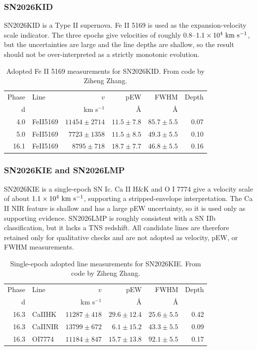 \documentclass[11pt]{article}
\begin{document}
\subsubsection{SN2026KID}
SN2026KID is a Type II supernova. Fe II 5169 is used as the expansion-velocity scale indicator. The three epochs give velocities of roughly $0.8$--$1.1\times10^4~{\rm km~s^{-1}}$, but the uncertainties are large and the line depths are shallow, so the result should not be over-interpreted as a strictly monotonic evolution.

\begin{table}[htbp]
\centering
\caption{Adopted Fe II 5169 measurements for SN2026KID. From code by Ziheng Zhang.}
\label{tab:kid-lines}
\begin{tabular}{r l r r r r}
\toprule
Phase & Line & $v$ & pEW & FWHM & Depth \\
d & & km s$^{-1}$ & \AA & \AA & \\
\midrule
4.0 & FeII5169 & $11454\pm2714$ & $11.5\pm7.8$ & $85.7\pm5.5$ & 0.07 \\
5.0 & FeII5169 & $7723\pm1358$ & $11.5\pm8.5$ & $49.3\pm5.5$ & 0.10 \\
16.1 & FeII5169 & $8795\pm718$ & $18.7\pm7.7$ & $46.8\pm5.5$ & 0.16 \\
\bottomrule
\end{tabular}
\end{table}

\subsubsection{SN2026KIE and SN2026LMP}
SN2026KIE is a single-epoch SN Ic. Ca II H\&K and O I 7774 give a velocity scale of about $1.1\times10^4~{\rm km~s^{-1}}$, supporting a stripped-envelope interpretation. The Ca II NIR feature is shallow and has a large pEW uncertainty, so it is used only as supporting evidence. SN2026LMP is roughly consistent with a SN IIb classification, but it lacks a TNS redshift. All candidate lines are therefore retained only for qualitative checks and are not adopted as velocity, pEW, or FWHM measurements.

\begin{table}[htbp]
\centering
\caption{Single-epoch adopted line measurements for SN2026KIE. From code by Ziheng Zhang.}
\label{tab:kie-lines}
\begin{tabular}{r l r r r r}
\toprule
Phase & Line & $v$ & pEW & FWHM & Depth \\
d & & km s$^{-1}$ & \AA & \AA & \\
\midrule
16.3 & CaIIHK & $11287\pm418$ & $29.6\pm12.4$ & $25.6\pm5.5$ & 0.42 \\
16.3 & CaIINIR & $13799\pm672$ & $6.1\pm15.2$ & $43.3\pm5.5$ & 0.09 \\
16.3 & OI7774 & $11184\pm847$ & $15.7\pm13.8$ & $92.1\pm5.5$ & 0.17 \\
\bottomrule
\end{tabular}
\end{table}
\end{document}
